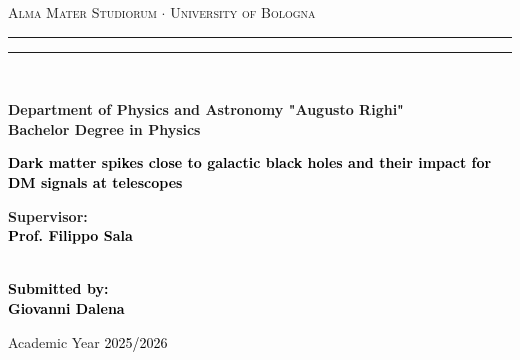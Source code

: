 
\begin{titlepage}
%
%
%
%
\begin{center}
{{\Large{\textsc{Alma Mater Studiorum $\cdot$ University of Bologna}}}} 
\rule[0.1cm]{15.8cm}{0.1mm}
\rule[0.5cm]{15.8cm}{0.6mm}
\\\vspace{3mm}

{\small{\bf Department of Physics and Astronomy "Augusto Righi" 
        \\Bachelor Degree in Physics}}

\end{center}

\vspace{23mm}

\begin{center}\textcolor{black}{
{\LARGE{\bf Dark matter spikes close to galactic black holes and their impact for DM signals at telescopes}}\\
}\end{center}

\vspace{50mm} \par \noindent

\begin{minipage}[t]{0.47\textwidth}

{\large{\bf Supervisor: \vspace{2mm}\\\textcolor{black}{
Prof. Filippo Sala}\\\\

}}
\end{minipage}
%
\hfill
%
\begin{minipage}[t]{0.47\textwidth}\raggedleft \textcolor{black}{
{\large{\bf Submitted by:
\vspace{2mm}\\
%
%
Giovanni Dalena}}}
\end{minipage}

\vspace{40mm}

\begin{center}
%
%
Academic Year \textcolor{black}{ 2025/2026}
\end{center}


\end{titlepage}

